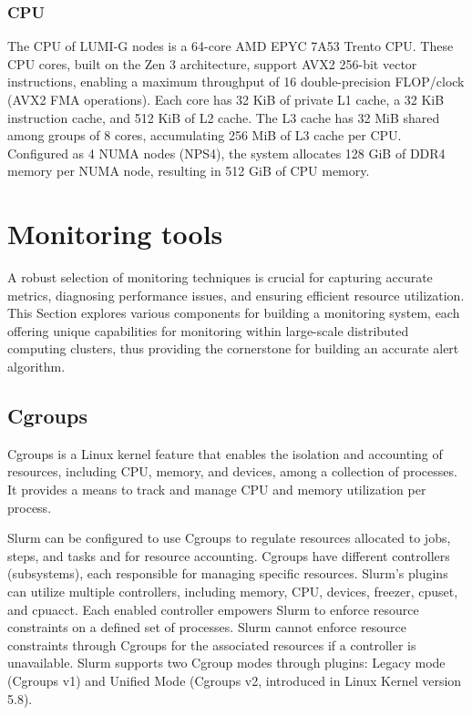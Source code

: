 \subsubsection{CPU}

The CPU of LUMI-G nodes is a 64-core AMD EPYC 7A53 Trento CPU. These CPU cores, built on the Zen 3 architecture, support AVX2 256-bit vector instructions, enabling a maximum throughput of 16 double-precision FLOP/clock (AVX2 FMA operations). Each core has 32 KiB of private L1 cache, a 32 KiB instruction cache, and 512 KiB of L2 cache. The L3 cache has 32 MiB shared among groups of 8 cores, accumulating 256 MiB of L3 cache per CPU. Configured as 4 NUMA nodes (NPS4), the system allocates 128 GiB of DDR4 memory per NUMA node, resulting in 512 GiB of CPU memory.

\section{Monitoring tools}
A robust selection of monitoring techniques is crucial for capturing accurate metrics, diagnosing performance issues, and ensuring efficient resource utilization. This Section explores various components for building a monitoring system, each offering unique capabilities for monitoring within large-scale distributed computing clusters, thus providing the cornerstone for building an accurate alert algorithm.

\subsection{Cgroups}
Cgroups \cite{7876184} is a Linux kernel feature that enables the isolation and accounting of resources, including CPU, memory, and devices, among a collection of processes. It provides a means to track and manage CPU and memory utilization per process.

Slurm can be configured to use Cgroups to regulate resources allocated to jobs, steps, and tasks and for resource accounting. Cgroups have different controllers (subsystems), each responsible for managing specific resources. Slurm's plugins can utilize multiple controllers, including memory, CPU, devices, freezer, cpuset, and cpuacct. Each enabled controller empowers Slurm to enforce resource constraints on a defined set of processes. Slurm cannot enforce resource constraints through Cgroups for the associated resources if a controller is unavailable. Slurm supports two Cgroup modes through plugins: Legacy mode (Cgroups v1) and Unified Mode (Cgroups v2, introduced in Linux Kernel version 5.8).

